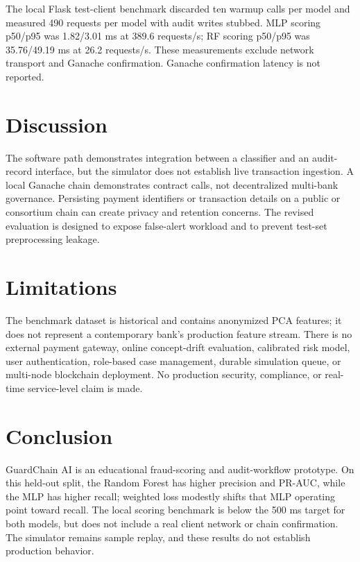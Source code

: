 \documentclass[conference]{IEEEtran}
\begin{document}
The local Flask test-client benchmark discarded ten warmup calls per model and measured 490 requests per model with audit writes stubbed. MLP scoring p50/p95 was 1.82/3.01 ms at 389.6 requests/s; RF scoring p50/p95 was 35.76/49.19 ms at 26.2 requests/s. These measurements exclude network transport and Ganache confirmation. Ganache confirmation latency is not reported.

\section{Discussion}
The software path demonstrates integration between a classifier and an audit-record interface, but the simulator does not establish live transaction ingestion. A local Ganache chain demonstrates contract calls, not decentralized multi-bank governance. Persisting payment identifiers or transaction details on a public or consortium chain can create privacy and retention concerns. The revised evaluation is designed to expose false-alert workload and to prevent test-set preprocessing leakage.

\section{Limitations}
The benchmark dataset is historical and contains anonymized PCA features; it does not represent a contemporary bank's production feature stream. There is no external payment gateway, online concept-drift evaluation, calibrated risk model, user authentication, role-based case management, durable simulation queue, or multi-node blockchain deployment. No production security, compliance, or real-time service-level claim is made.

\section{Conclusion}
GuardChain AI is an educational fraud-scoring and audit-workflow prototype. On this held-out split, the Random Forest has higher precision and PR-AUC, while the MLP has higher recall; weighted loss modestly shifts that MLP operating point toward recall. The local scoring benchmark is below the 500 ms target for both models, but does not include a real client network or chain confirmation. The simulator remains sample replay, and these results do not establish production behavior.
\end{document}
